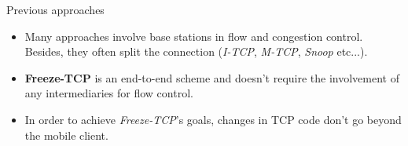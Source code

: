 \begin{frame}{Previous approaches}
  \begin{itemize}
    \item Many approaches involve base stations in flow and congestion control. Besides, they
    often split the connection (\textit{I-TCP}, \textit{M-TCP}, \textit{Snoop} etc...).

    \item \textbf{Freeze-TCP} is an end-to-end scheme and doesn't require the involvement of any
        intermediaries for flow control.
    \item In order to achieve \textit{Freeze-TCP}'s goals, changes in TCP code don't go beyond the mobile
          client.
  \end{itemize}
\end{frame}

